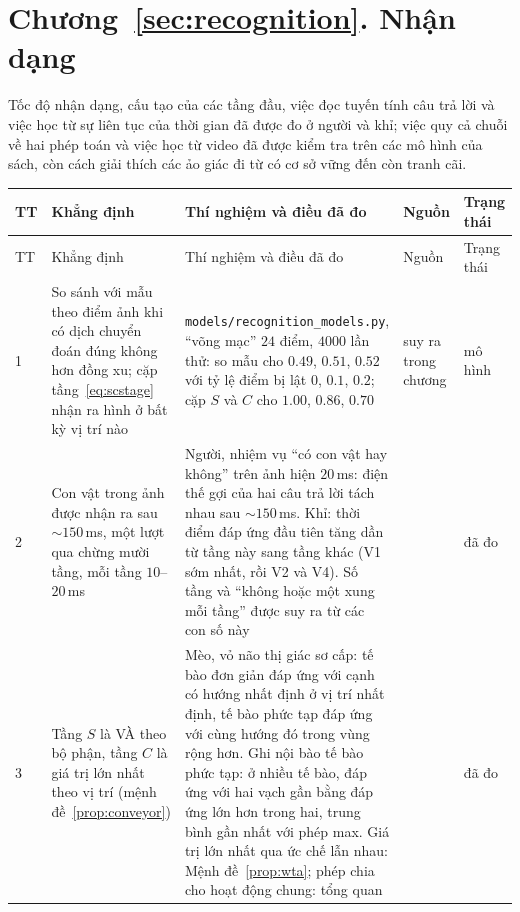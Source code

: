 \section{Chương~\ref{sec:recognition}. Nhận dạng}

Tốc độ nhận dạng, cấu tạo của các tầng đầu, việc đọc tuyến tính câu trả lời và việc học từ sự liên tục của thời gian đã được đo ở người và khỉ; việc quy cả chuỗi về hai phép toán và việc học từ video đã được kiểm tra trên các mô hình của sách, còn cách giải thích các ảo giác đi từ có cơ sở vững đến còn tranh cãi.

{\footnotesize
\setlength{\tabcolsep}{3pt}\renewcommand{\arraystretch}{1.15}
\begin{longtable}{>{\raggedright}p{0.5cm}>{\raggedright}p{4.0cm}>{\raggedright}p{5.6cm}>{\raggedright}p{2.3cm}>{\raggedright\arraybackslash}p{1.7cm}}
\toprule
TT & Khẳng định & Thí nghiệm và điều đã đo & Nguồn & Trạng thái \\
\midrule\endfirsthead
\toprule
TT & Khẳng định & Thí nghiệm và điều đã đo & Nguồn & Trạng thái \\
\midrule\endhead
1 & So sánh với mẫu theo điểm ảnh khi có dịch chuyển đoán đúng không hơn đồng xu; cặp tầng~\eqref{eq:scstage} nhận ra hình ở bất kỳ vị trí nào & \texttt{models/\allowbreak recognition\_models.py}, ``võng mạc'' $24$ điểm, $4000$ lần thử: so mẫu cho $0.49$, $0.51$, $0.52$ với tỷ lệ điểm bị lật $0$, $0.1$, $0.2$; cặp $S$ và $C$ cho $1.00$, $0.86$, $0.70$ & suy ra trong chương & mô hình \\
2 & Con vật trong ảnh được nhận ra sau $\sim150$\,ms, một lượt qua chừng mười tầng, mỗi tầng $10$--$20$\,ms & Người, nhiệm vụ ``có con vật hay không'' trên ảnh hiện $20$\,ms: điện thế gợi của hai câu trả lời tách nhau sau $\sim150$\,ms. Khỉ: thời điểm đáp ứng đầu tiên tăng dần từ tầng này sang tầng khác (V1 sớm nhất, rồi V2 và V4). Số tầng và ``không hoặc một xung mỗi tầng'' được suy ra từ các con số này & \cite{Thorpe1996,Schmolesky1998} & đã đo \\
3 & Tầng $S$ là VÀ theo bộ phận, tầng $C$ là giá trị lớn nhất theo vị trí (mệnh đề~\ref{prop:conveyor}) & Mèo, vỏ não thị giác sơ cấp: tế bào đơn giản đáp ứng với cạnh có hướng nhất định ở vị trí nhất định, tế bào phức tạp đáp ứng với cùng hướng đó trong vùng rộng hơn. Ghi nội bào tế bào phức tạp: ở nhiều tế bào, đáp ứng với hai vạch gần bằng đáp ứng lớn hơn trong hai, trung bình gần nhất với phép max. Giá trị lớn nhất qua ức chế lẫn nhau: Mệnh đề~\ref{prop:wta}; phép chia cho hoạt động chung: tổng quan & \cite{HubelWiesel1962,Lampl2004,Carandini2012} & đã đo \\

\end{longtable}}
